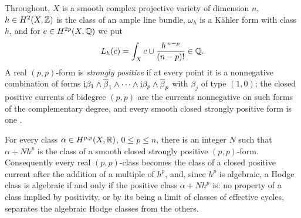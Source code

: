 Throughout, $X$ is a smooth complex projective variety of dimension $n$, $h\in
H^{2}(X,\mathbb{Z})$ is the class of an ample line bundle, $\omega_{h}$ is a K\"ahler
form with class $h$, and for $c\in H^{2p}(X,\mathbb{Q})$ we put
\[
  L_{h}(c)=\int_{X}c\cup\frac{h^{\,n-p}}{(n-p)!}\in\mathbb{Q} .
\]
A real $(p,p)$-form is \emph{strongly positive} if at every point it is a
nonnegative combination of forms $\mathrm{i}\beta_{1}\wedge\overline{\beta}_{1}
\wedge\cdots\wedge\mathrm{i}\beta_{p}\wedge\overline{\beta}_{p}$ with $\beta_{j}$
of type $(1,0)$; the closed positive currents of bidegree $(p,p)$ are the
currents nonnegative on such forms of the complementary degree, and every
smooth closed strongly positive form is one \cite[Chapter~III]{Dem12}.

\begin{proposition}\label{prop:positivitynotest}
For every class $\alpha\in H^{p,p}(X,\mathbb{R})$, $0\le p\le n$, there is an integer
$N$ such that $\alpha+Nh^{p}$ is the class of a smooth closed strongly positive
$(p,p)$-form. Consequently every real $(p,p)$-class becomes the class of a
closed positive current after the addition of a multiple of $h^{p}$, and, since
$h^{p}$ is algebraic, a Hodge class is algebraic if and only if the positive
class $\alpha+Nh^{p}$ is: no property of a class implied by positivity, or by
its being a limit of classes of effective cycles, separates the algebraic Hodge
classes from the others.
\end{proposition}

